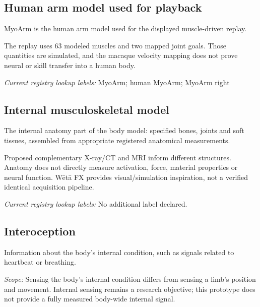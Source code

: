 \begin{samepage}
\subsection*{Human arm model used for playback}
\noindent MyoArm is the human arm model used for the displayed muscle-driven replay.\par
\end{samepage}
\begin{samepage}
\noindent The replay uses 63 modeled muscles and two mapped joint goals. Those quantities are simulated, and the macaque velocity mapping does not prove neural or skill transfer into a human body.\par\nopagebreak[4]

\end{samepage}


\noindent\textit{Current registry lookup labels:} MyoArm; human MyoArm; MyoArm right\par

\begin{samepage}
\subsection*{Internal musculoskeletal model}
\noindent The internal anatomy part of the body model: specified bones, joints and soft tissues, assembled from appropriate registered anatomical measurements.\par
\end{samepage}
\noindent Proposed complementary X-ray/CT and MRI inform different structures. Anatomy does not directly measure activation, force, material properties or neural function. Wētā FX provides visual/simulation inspiration, not a verified identical acquisition pipeline.\par


\noindent\textit{Current registry lookup labels:} No additional label declared.\par

\begin{samepage}
\subsection*{Interoception}
\noindent Information about the body’s internal condition, such as signals related to heartbeat or breathing.\par
\end{samepage}
\begin{samepage}
\noindent\textit{Scope:} Sensing the body’s internal condition differs from sensing a limb’s position and movement. Internal sensing remains a research objective; this prototype does not provide a fully measured body-wide internal signal.\par\nopagebreak[4]

\end{samepage}


